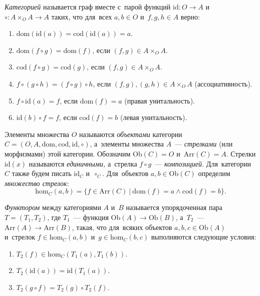 \documentclass{article}
\begin{document}
\textit{Категорией} называется граф вместе с~парой функций $\mathrm{id} : O \rightarrow A$
и~$\circ : A \times_O A \rightarrow A$ таких, что для~всех $a, b \in O$ и~$f, g, h \in A$ верно:
\begin{enumerate}
    \item $\mathrm{dom}(\mathrm{id}(a)) = \mathrm{cod}(\mathrm{id}(a)) = a$.
    \item $\mathrm{dom}(f \circ g) = \mathrm{dom}(f)$, если $(f, g) \in A \times_O A$.
    \item $\mathrm{cod}(f \circ g) = \mathrm{cod}(g)$, если $(f, g) \in A \times_O A$.
    \item $f \circ (g \circ h) = (f \circ g) \circ h$, если $(f, g), (g, h) \in A \times_O A$ (ассоциативность).
    \item $f \circ \mathrm{id}(a) = f$, если $\mathrm{dom}(f) = a$ (правая унитальность).
    \item $\mathrm{id}(b) \circ f = f$, если $\mathrm{cod}(f) = b$ (левая унитальность).
\end{enumerate}

Элементы множества $O$ называются \textit{объектами} категории $C = (O, A, \mathrm{dom}, \mathrm{cod}, \mathrm{id}, \circ)$,
а~элементы множества $A$~— \textit{стрелками} (или морфизмами) этой категории. Обозначим $\mathrm{Ob}(C) = O$ и~$\mathrm{Arr}(C) = A$.
Стрелки $\mathrm{id}(x)$ называются \textit{единичными,} а~стрелка $f \circ g$~— \textit{композицией.} Для~категории $C$ также будем писать $\mathrm{id}_C$ и~$\circ_C$.
Для~объектов $a, b \in \mathrm{Ob}(C)$ определим \textit{множество стрелок}:
$$
    \mathrm{hom}_C(a, b) = \{ f \in \mathrm{Arr}(C)\ | \ \mathrm{dom}(f) = a \wedge \mathrm{cod}(f) = b \}.
$$

\textit{Функтором} между категориями $A$ и~$B$ называется упорядоченная пара $T = (T_1, T_2)$,
где $T_1$~— функция $\mathrm{Ob}(A) \rightarrow \mathrm{Ob}(B)$, а~$T_2$~— $\mathrm{Arr}(A) \rightarrow \mathrm{Arr}(B)$,
такая, что для~всяких объектов $a, b, c \in \mathrm{Ob}(A)$ и~стрелок $f \in \mathrm{hom}_C(a, b)$ и~$g \in \mathrm{hom}_C(b, c)$ выполняются
следующие условия:
\begin{enumerate}
    \item $T_2(f) \in \mathrm{hom}_C(T_1(a), T_1(b))$.
    \item $T_2(\mathrm{id}(a)) = \mathrm{id}(T_1(a))$.
    \item $T_2(g \circ f) = T_2(g) \circ T_2(f)$.
\end{enumerate}
\end{document}
